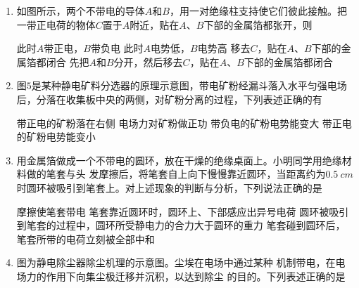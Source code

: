 

\begin{enumerate}[leftmargin=0em]
\renewcommand{\labelenumi}{\arabic{enumi}.}
\item
{}
如图所示，两个不带电的导体$ A $和$ B $，用一对绝缘柱支持使它们彼此接触。把一带正电荷的物体$ C $置于$ A $附近，贴在$ A $、$ B $下部的金属箔都张开，则  
\begin{figure}[h!]
\centering

\end{figure}



\fourchoices
{此时$ A $带正电，$ B $带负电}
{此时$ A $电势低，$ B $电势高}
{移去$ C $，贴在$ A $、$ B $下部的金属箔都闭合}
{先把$ A $和$ B $分开，然后移去$ C $，贴在$ A $、$ B $下部的金属箔都闭合}





\item
{}
图$ 5 $是某种静电矿料分选器的原理示意图，带电矿粉经漏斗落入水平匀强电场后，分落在收集板中央的两侧，对矿粉分离的过程，下列表述正确的有  
\begin{figure}[h!]
\centering

\end{figure}



\fourchoices
{带正电的矿粉落在右侧}
{电场力对矿粉做正功}
{带负电的矿粉电势能变大}
{带正电的矿粉电势能变小}





\item
{}
用金属箔做成一个不带电的圆环，放在干燥的绝缘桌面上。小明同学用绝缘材料做的笔套与头
发摩擦后，将笔套自上向下慢慢靠近圆环，当距离约为$ 0.5 \ cm $时圆环被吸引到笔套上。对上述现象的判断与分析，下列说法正确的是  


\fourchoices
{摩擦使笔套带电}
{笔套靠近圆环时，圆环上、下部感应出异号电荷}
{圆环被吸引到笔套的过程中，圆环所受静电力的合力大于圆环的重力}
{笔套碰到圆环后，笔套所带的电荷立刻被全部中和}




\item
{}
图为静电除尘器除尘机理的示意图。尘埃在电场中通过某种
机制带电，在电场力的作用下向集尘极迁移并沉积，以达到除尘
的目的。下列表述正确的是  
\begin{figure}[h!]
\centering

\end{figure}




\end{enumerate}
